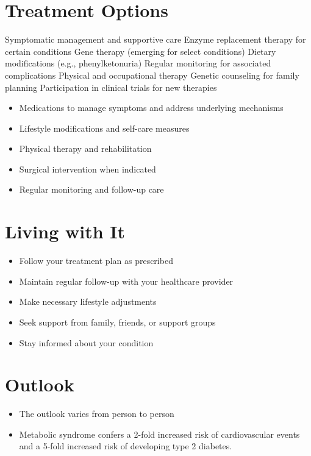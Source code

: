 \section{Treatment Options}
Symptomatic management and supportive care Enzyme replacement therapy for certain conditions Gene therapy (emerging for select conditions) Dietary modifications (e.g., phenylketonuria) Regular monitoring for associated complications Physical and occupational therapy Genetic counseling for family planning Participation in clinical trials for new therapies

\begin{itemize}[noitemsep]
  \item Medications to manage symptoms and address underlying mechanisms
  \item Lifestyle modifications and self-care measures
  \item Physical therapy and rehabilitation
  \item Surgical intervention when indicated
  \item Regular monitoring and follow-up care
\end{itemize}
\section{Living with It}
\begin{itemize}[noitemsep]
  \item Follow your treatment plan as prescribed
  \item Maintain regular follow-up with your healthcare provider
  \item Make necessary lifestyle adjustments
  \item Seek support from family, friends, or support groups
  \item Stay informed about your condition
\end{itemize}
\section{Outlook}
\begin{itemize}[noitemsep]
  \item The outlook varies from person to person
  \item Metabolic syndrome confers a 2-fold increased risk of cardiovascular events and a 5-fold increased risk of developing type 2 diabetes.
\end{itemize}
